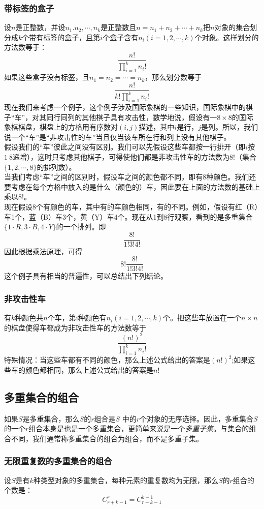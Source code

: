 \documentclass{ctexart}
\begin{document}
\subsubsection{带标签的盒子}设$n$是正整数，并设$n_1.n_2,\cdots,n_k$是正整数且$n = n_1 + n_2 + \cdots + n_k$把$n$对象的集合划分成$k$个带有标签的盒子，且第$i$个盒子含有$n_i(i = 1,2,\cdots,k)$个对象。这样划分的方法数等于：
\[\frac{n!}{\prod_{i=1}^k n_i!}\]
如果这些盒子没有标签，且$n_1 = n_2 = \cdots = n_k$，那么划分数等于
\[\frac{n!}{k!\prod_{i=1}^k n_i!}\]
现在我们来考虑一个例子，这个例子涉及国际象棋的一些知识，国际象棋中的棋子“车”，对其同行同列的其他棋子具有攻击性，数学地说，假设有一$8 \times 8$的国际象棋棋盘，棋盘上的方格用有序数对$(i,j)$描述，其中$i$是行，$j$是列。所以，我们说一个“车”是“非攻击性的车”当且仅当该车所在行和列上没有其他棋子。\\
假设我们的“车”彼此之间没有区别。我们可以先假设这些车都按一行排开（即$i$按$1~8$递增），这时只考虑其他棋子，可得使他们都是非攻击性车的方法数为$8!$（集合$\{1,2,\cdots,8\}$的排列数）。\\
当我们考虑“车”之间的区别时，假设车之间的颜色都不同，即有8种颜色。我们还要考虑在每个方格中放入的是什么（颜色的）车，因此要在上面的方法数的基础上乘以$8!$。\\
现在假设8个有颜色的车，其中有的车颜色相同，有的不同。例如，假设有红（R）车1个，蓝（B）车3个，黄（Y）车4个。现在从1到8行观察，看到的是多重集合$\{1 \cdot R, 3 \cdot B,4 \cdot Y\}$的一个排列。即
\[\frac{8!}{1!3!4!}\]
因此根据乘法原理，可得
\[8! \frac{8!}{1!3!4!} \]
这个例子具有相当的普遍性，可以总结出下列结论。
\subsubsection{非攻击性车}有$k$种颜色共$n$个车，第i种颜色有$n_i(i = 1,2,\cdots,k)$个。把这些车放置在一个$n \times n$的棋盘使得车都成为非攻击性车的方法数等于
\[\frac{(n!)^2}{\prod_{i=1}^k n_i!}\]
特殊情况：当这些车都有不同的颜色，那么上述公式给出的答案是$(n!)^2$;如果这些车的颜色都相同，那么上述公式给出的答案是$n!$

   \subsection{多重集合的组合}
   如果$S$是多重集合，那么$S$的$r$组合是$S$ 中的$r$个对象的无序选择。因此，多重集合$S$的一个$r$组合本身是也是一个多重集合，更简单来说是一个\textit{多重子集}。与集合的组合不同，我们通常称多重集合的组合为组合，而不是多重子集。
   \subsubsection{无限重复数的多重集合的组合}
   设$S$是有$k$种类型对象的多重集合，每种元素的重复数均为无限，那么$S$的$r$组合的个数是：
   \[C_{r+k-1}^r = C_{r+k-1}^{k-1}\]
\end{document}
